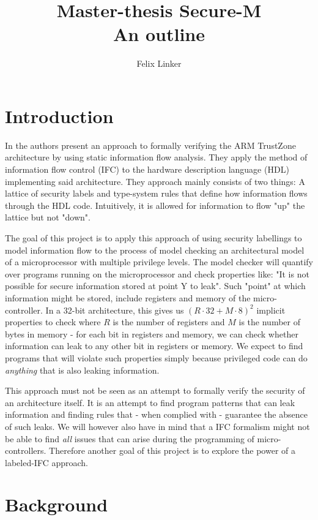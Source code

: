 \documentclass{securem}
\title{Master-thesis Secure-M \\ \large{An outline}}
\author{Felix Linker}
\date{}
\begin{document}
\maketitle

\section{Introduction}

In \cite{Ferraiuolo17} the authors present an approach to formally verifying the ARM TrustZone architecture by using static information flow analysis.
They apply the method of information flow control (IFC) to the hardware description language (HDL) implementing said architecture.
They approach mainly consists of two things: A lattice of security labels and type-system rules that define how information flows through the HDL code.
Intuitively, it is allowed for information to flow "up" the lattice but not "down".

The goal of this project is to apply this approach of using security labellings to model information flow to the process of model checking an architectural model of a microprocessor with multiple privilege levels.
The model checker will quantify over programs running on the microprocessor and check properties like: "It is not possible for secure information stored at point Y to leak".
Such "point" at which information might be stored, include registers and memory of the micro-controller.
In a 32-bit architecture, this gives us $ (R \cdot 32 + M \cdot 8)^2 $ implicit properties to check where $ R $ is the number of registers and $ M $ is the number of bytes in memory - for each bit in registers and memory, we can check whether information can leak to any other bit in registers or memory.
We expect to find programs that will violate such properties simply because privileged code can do \textit{anything} that is also leaking information.

This approach must not be seen as an attempt to formally verify the security of an architecture itself.
It is an attempt to find program patterns that can leak information and finding rules that - when complied with - guarantee the absence of such leaks.
We will however also have in mind that a IFC formalism might not be able to find \textit{all} issues that can arise during the programming of micro-controllers.
Therefore another goal of this project is to explore the power of a labeled-IFC approach.

\section{Background}
\end{document}
